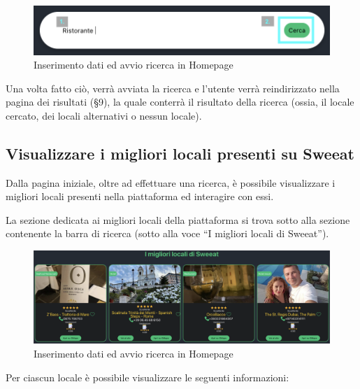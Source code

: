 \begin{figure}[H]
\centering
\includegraphics[scale=0.5]{./images/Homepage/Ricerca2.png} 
\caption{Inserimento dati ed avvio ricerca in Homepage}
\end{figure}

Una volta fatto ciò, verrà avviata la ricerca e l’utente verrà reindirizzato nella pagina dei risultati (\S{9}), la quale conterrà il risultato della ricerca (ossia, il locale cercato, dei locali alternativi o nessun locale).

\subsection{Visualizzare i migliori locali presenti su Sweeat}

Dalla pagina iniziale, oltre ad effettuare una ricerca, è possibile visualizzare i migliori locali presenti nella piattaforma ed interagire con essi.

La sezione dedicata ai migliori locali della piattaforma si trova sotto alla sezione contenente la barra di ricerca (sotto alla voce “I migliori locali di Sweeat”).

\begin{figure}[H]
\centering
\includegraphics[scale=0.3]{./images/Homepage/MiglioriLocali.png} 
\caption{Inserimento dati ed avvio ricerca in Homepage}
\end{figure}

Per ciascun locale è possibile visualizzare le seguenti informazioni:

